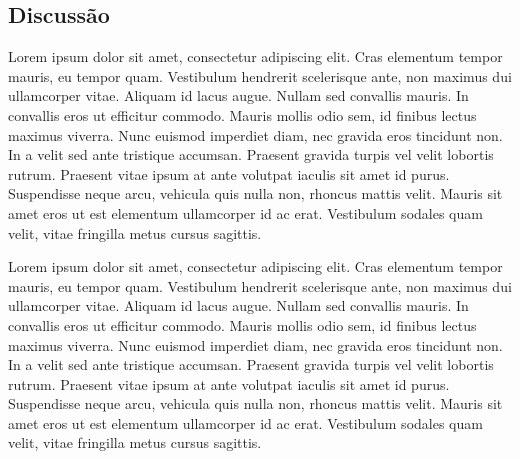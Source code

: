 \documentclass[conference]{IEEEtran}
\begin{document}
\subsection{Discussão}

Lorem ipsum dolor sit amet, consectetur adipiscing elit. Cras elementum tempor mauris, eu tempor quam. Vestibulum hendrerit scelerisque ante, non maximus dui ullamcorper vitae. Aliquam id lacus augue. Nullam sed convallis mauris. In convallis eros ut efficitur commodo. Mauris mollis odio sem, id finibus lectus maximus viverra. Nunc euismod imperdiet diam, nec gravida eros tincidunt non. In a velit sed ante tristique accumsan. Praesent gravida turpis vel velit lobortis rutrum. Praesent vitae ipsum at ante volutpat iaculis sit amet id purus. Suspendisse neque arcu, vehicula quis nulla non, rhoncus mattis velit. Mauris sit amet eros ut est elementum ullamcorper id ac erat. Vestibulum sodales quam velit, vitae fringilla metus cursus sagittis.

Lorem ipsum dolor sit amet, consectetur adipiscing elit. Cras elementum tempor mauris, eu tempor quam. Vestibulum hendrerit scelerisque ante, non maximus dui ullamcorper vitae. Aliquam id lacus augue. Nullam sed convallis mauris. In convallis eros ut efficitur commodo. Mauris mollis odio sem, id finibus lectus maximus viverra. Nunc euismod imperdiet diam, nec gravida eros tincidunt non. In a velit sed ante tristique accumsan. Praesent gravida turpis vel velit lobortis rutrum. Praesent vitae ipsum at ante volutpat iaculis sit amet id purus. Suspendisse neque arcu, vehicula quis nulla non, rhoncus mattis velit. Mauris sit amet eros ut est elementum ullamcorper id ac erat. Vestibulum sodales quam velit, vitae fringilla metus cursus sagittis.




\end{document}
